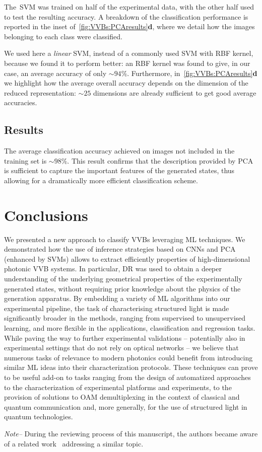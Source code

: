 The~\ac{SVM} was trained on half of the experimental data, with the other half used to test the resulting accuracy. A breakdown of the classification performance is reported in the inset of~\cref{fig:VVBs:PCAresults}\textbf{d}, where we detail how the images belonging to each class were classified.

We used here a \emph{linear} SVM, instead of a commonly used SVM with RBF kernel, because we found it to perform better: an RBF kernel was found to give, in our case, an average accuracy of only $\sim94\%$.
Furthermore, in~\cref{fig:VVBs:PCAresults}\textbf{d} we highlight how the average overall accuracy depends on the dimension of the reduced representation: $\sim 25$ dimensions are already sufficient to get good average accuracies.

\subsection{Results}

The average classification accuracy achieved on images not included in the training set is $\sim 98 \%$. This result confirms that the description provided by \ac{PCA} is sufficient to capture the important features of the generated states, thus allowing for a dramatically more efficient classification scheme.


\section{Conclusions}
\label{sec:VVBs:conclusions}

We presented a new approach to classify \acp{VVB} leveraging ML techniques. We demonstrated how the use of inference strategies based on CNNs and PCA (enhanced by SVMs) allows to extract efficiently properties of high-dimensional photonic \ac{VVB} systems.
In particular, DR was used to obtain a deeper understanding of the underlying geometrical properties of the experimentally generated states, without requiring prior knowledge about the physics of the generation apparatus.
By embedding a variety of {\ac{ML}} algorithms into our experimental pipeline, the task of characterising structured light is made significantly broader in the methods, ranging from supervised to unsupervised learning, and more flexible in the applications, classification and regression tasks.
%
% 
While paving the way to further experimental validations -- potentially also in experimental settings that do not rely on optical networks -- we believe that numerous tasks of relevance to modern photonics could benefit from introducing similar {\ac{ML}} ideas into their characterization protocols. These techniques can prove to be useful add-on to tasks ranging from the design of automatized approaches to the characterization of experimental platforms and experiments, to the provision of solutions to OAM demultiplexing in the context of classical and quantum communication and, more generally, for the use of structured light in quantum technologies.

\textit{Note--} During the reviewing process of this manuscript, the authors
became aware of a related work~\cite{liu2019superhighresolution} addressing a similar topic.
